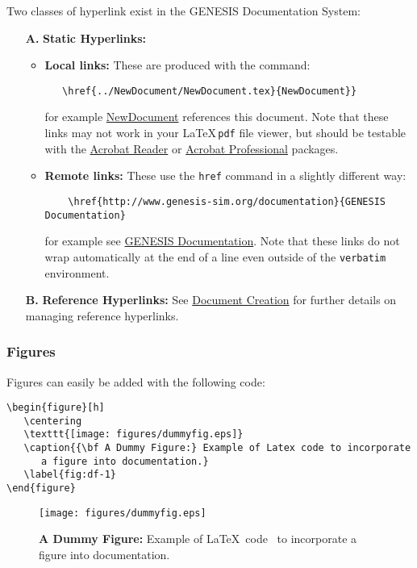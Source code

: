 \documentclass[12pt]{article}
\begin{document}
Two classes of hyperlink exist in the GENESIS Documentation System:

\begin{itemize}
\item[{\bf A.}]{\bf Static Hyperlinks:} 
   \begin{itemize}
      \item{\bf Local links:} These are produced with the command:
\begin{verbatim}
   \href{../NewDocument/NewDocument.tex}{NewDocument}}
\end{verbatim}
for example \href{../NewDocument/NewDocument.tex}{NewDocument} references this document.
Note that these links may not work in your \LaTeX\,{\tt pdf} file viewer, but should be testable with the \href{http://get.adobe.com/reader/}{Acrobat Reader} or \href{http://www.adobe.com/products/acrobatpro/tryout.html}{Acrobat Professional} packages.
      \item {\bf Remote links:} These use the {\tt href} command in a slightly different way:
\begin{verbatim}
    \href{http://www.genesis-sim.org/documentation}{GENESIS Documentation}
\end{verbatim}
for example see \href{http://www.genesis-sim.org/documentation}{GENESIS Documentation}. Note that these links do not wrap automatically at the end of a line even outside of the {\tt verbatim} environment.
\end{itemize}

\item[{\bf B.}]{\bf Reference Hyperlinks:} See \href{../document-create/document-create.tex}{Document Creation} for further details on managing reference hyperlinks.

\end{itemize}

\subsubsection*{Figures}

Figures can easily be added with the following code:

\begin{verbatim}
\begin{figure}[h]
   \centering
   \texttt{[image: figures/dummyfig.eps]}
   \caption{{\bf A Dummy Figure:} Example of Latex code to incorporate
      a figure into documentation.}
   \label{fig:df-1}
\end{figure}
\end{verbatim}

\begin{figure}[h]
  \centering
   \texttt{[image: figures/dummyfig.eps]}
\caption{{\bf A Dummy Figure:} Example of \LaTeX\,\,\,code \
   to incorporate a figure into documentation.}
  \label{fig:df-1}
\end{figure}
\end{document}
